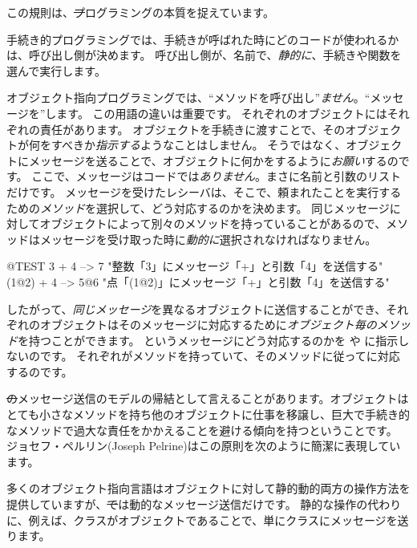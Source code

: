 \documentclass[a4paper,10pt,twoside]{book}
\begin{document}
この規則は、\st プログラミングの本質を捉えています。

手続き的プログラミングでは、手続きが呼ばれた時にどのコードが使われるかは、呼び出し側が決めます。
呼び出し側が、名前で、\emph{静的に}、手続きや関数を選んで実行します。

オブジェクト指向プログラミングでは、``メソッドを呼び出し''\emph{ません}。``メッセージを''します。
この用語の違いは重要です。
それぞれのオブジェクトにはそれぞれの責任があります。
オブジェクトを手続きに渡すことで、そのオブジェクトが何をすべきか\emph{指示する}ようなことはしません。
そうではなく、オブジェクトにメッセージを送ることで、オブジェクトに何かをするように\emph{お願い}するのです。
ここで、メッセージはコードでは\emph{ありません}。まさに名前と引数のリストだけです。
メッセージを受けたレシーバは、そこで、頼まれたことを実行するための\emph{メソッド}を選択して、どう対応するのかを決めます。
同じメッセージに対してオブジェクトによって別々のメソッドを持っていることがあるので、メソッドはメッセージを受け取った時に\emph{動的に}選択されなければなりません。
\begin{code}{@TEST}
3 + 4         --> 7          "整数「3」にメッセージ「+」と引数「4」を送信する"
(1@2) + 4 --> 5@6    "点「(1@2)」にメッセージ「+」と引数「4」を送信する"
\end{code}
\noindent
したがって、\emph{同じメッセージ}を異なるオブジェクトに送信することができ、それぞれのオブジェクトはそのメッセージに対応するために\emph{オブジェクト毎のメソッド}を持つことができます。
というメッセージにどう対応するのかを や に指示しないのです。
それぞれが\ct{+}メソッドを持っていて、そのメソッドに従ってに対応するのです。

\st のメッセージ送信のモデルの帰結として言えることがあります。オブジェクトはとても小さなメソッドを持ち他のオブジェクトに仕事を移譲し、巨大で手続き的なメソッドで過大な責任をかかえることを避ける傾向を持つということです。
ジョセフ・ペルリン(Joseph Pelrine)はこの原則を次のように簡潔に表現しています。

多くのオブジェクト指向言語はオブジェクトに対して静的動的両方の操作方法を提供していますが、\st では動的なメッセージ送信だけです。
静的な操作の代わりに、例えば、クラスがオブジェクトであることで、単にクラスにメッセージを送ります。
\end{document}
